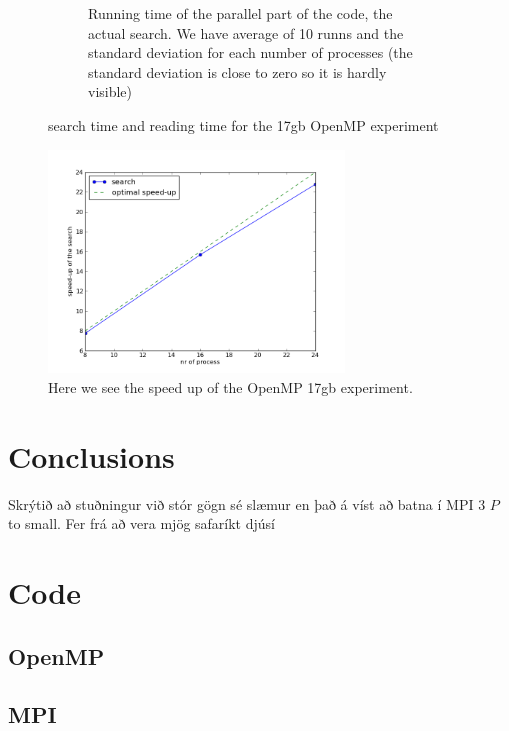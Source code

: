 \documentclass[a4paper,10pt]{article}
\begin{document}
\begin{figure}[h!t]
\begin{subfigure}[b]{0.70\textwidth}
                \caption{Running time of the parallel part of the code, the actual search. 
                         We have average of 10 runns and the standard deviation for each number
                         of processes (the standard deviation is close to zero so it is hardly 
                         visible)}
                \label{fig:mpio_search}
        \end{subfigure}
        \caption{search time and reading time for the 17gb OpenMP experiment}
\end{figure}

\begin{figure}[htb]
  \centering
  \includegraphics[width=0.7\textwidth]{graphics/mpio17gb/search_speedup.png}
  \caption{Here we see the speed up of the OpenMP 17gb experiment.}
  \label{fig:mpio_speedup}
\end{figure}
\clearpage

\section{Conclusions}

Skrýtið að stuðningur við stór gögn sé slæmur en það á víst að batna í MPI 3
$P$ to small.
Fer frá að vera mjög safaríkt djúsí 
\appendix
\section{Code}
%    
  \subsection{OpenMP}
       
  \subsection{MPI}
     
\end{document}
